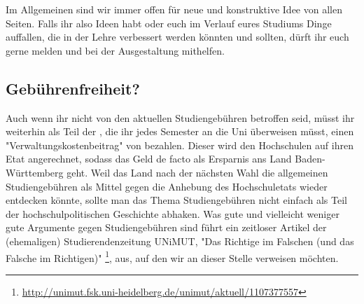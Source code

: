 Im Allgemeinen sind wir immer offen für neue und konstruktive Idee von allen Seiten. Falls ihr also Ideen habt oder euch im Verlauf eures Studiums Dinge auffallen, die in der Lehre verbessert werden könnten und sollten, dürft ihr euch gerne melden und bei der Ausgestaltung mithelfen.

\subsection{Gebührenfreiheit?}
Auch wenn ihr nicht von den aktuellen Studiengebühren betroffen seid, müsst ihr weiterhin als Teil der \EUR{\beitragssumme}, die ihr jedes Semester an die Uni überweisen müsst, einen "Verwaltungskostenbeitrag" von \EUR{\verwaltungsbetrag} bezahlen. Dieser wird den Hochschulen auf ihren Etat angerechnet, sodass das Geld de facto als Ersparnis ans Land Baden-Württemberg geht. Weil das Land nach der nächsten Wahl die allgemeinen Studiengebühren als Mittel gegen die Anhebung des Hochschuletats wieder entdecken könnte, sollte man das Thema Studiengebühren nicht einfach als Teil der hochschulpolitischen Geschichte abhaken. Was gute und vielleicht weniger gute Argumente gegen Studiengebühren sind führt ein zeitloser Artikel der (ehemaligen) Studierendenzeitung UNiMUT, "Das Richtige im Falschen (und das Falsche im Richtigen)"  \footnote{\url{http://unimut.fsk.uni-heidelberg.de/unimut/aktuell/1107377557}}, aus, auf den wir an dieser Stelle verweisen möchten.




